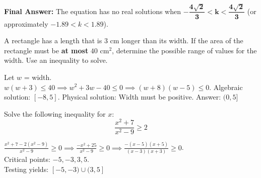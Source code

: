 \documentclass[12pt]{exam}
\begin{document}
\begin{questions}
\begin{solution}
    \textbf{Final Answer:} The equation has no real solutions when $\mathbf{-\dfrac{4\sqrt{2}}{3} < k < \dfrac{4\sqrt{2}}{3}}$ 
    (or approximately $-1.89 < k < 1.89$).
\end{solution}

\pagebreak
\question A rectangle has a length that is $3$ cm longer than its width. If the area of the rectangle must be \textbf{at most} $40$ cm$^2$, determine the possible range of values for the width. Use an inequality to solve.
\begin{solution}
    Let $w$ = width. $w(w+3) \leq 40 \implies w^2+3w-40 \leq 0 \implies (w+8)(w-5) \leq 0$.
    Algebraic solution: $[-8, 5]$. Physical solution: Width must be positive. Answer: $(0, 5]$
\end{solution}

\question Solve the following inequality for $x$:
\[ \dfrac{x^2 + 7}{x^2 - 9} \geq 2 \]
\begin{solution}
    $\frac{x^2 + 7 - 2(x^2 - 9)}{x^2 - 9} \geq 0 \implies \frac{-x^2 + 25}{x^2 - 9} \geq 0 \implies \frac{-(x-5)(x+5)}{(x-3)(x+3)} \geq 0$. \\
    Critical points: $-5, -3, 3, 5$. \\
    Testing yields: $[-5, -3) \cup (3, 5]$
\end{solution}

\pagebreak

\end{questions}
\end{document}

